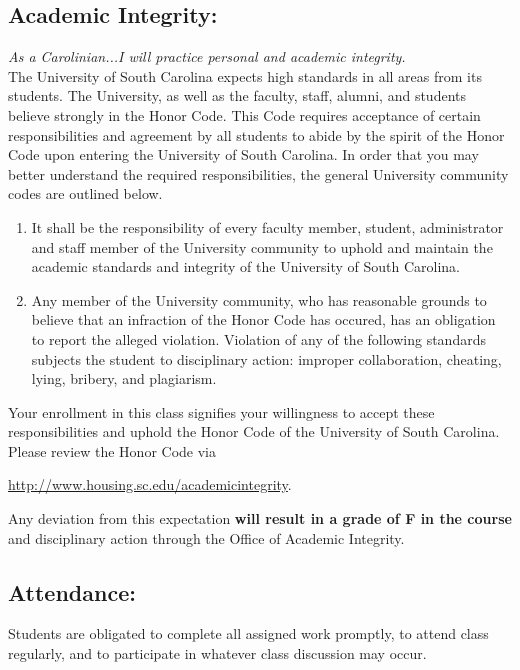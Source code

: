 \documentclass[10pt]{amsart}
\begin{document}
\subsection*{Academic Integrity:} 
\textit{As a Carolinian...I will practice personal and academic integrity.}\\

\noindent 
The University of South Carolina expects high standards in all areas from its students.
The University, as well as the faculty, staff, alumni, and students believe strongly in the Honor Code.
This Code requires acceptance of certain responsibilities and agreement by all students to abide by the spirit of the Honor Code upon entering the University of South Carolina.
In order that you may better understand the required responsibilities, the general University community codes are outlined below.

\begin{enumerate}
\item
  It shall be the responsibility of every faculty member, student, administrator and staff member of the University community to uphold and maintain the academic standards and integrity of the University of South Carolina.
\item
  Any member of the University community, who has reasonable grounds to believe that an infraction of the Honor Code has occured, has an obligation to report the alleged violation.
  Violation of any of the following standards subjects the student to disciplinary action: improper collaboration, cheating, lying, bribery, and plagiarism.
\end{enumerate}

\noindent
Your enrollment in this class signifies your willingness to accept these responsibilities and uphold the Honor Code of the University of South Carolina.
Please review the Honor Code via
\begin{center}
  \url{http://www.housing.sc.edu/academicintegrity}.
\end{center}

\noindent
Any deviation from this expectation \textbf{will result in a grade of F in the course} and disciplinary action through the Office of Academic Integrity.
\subsection*{Attendance:} 
Students are obligated to complete all assigned work promptly, to attend class regularly, and to participate in whatever class discussion may occur.\\
\end{document}
